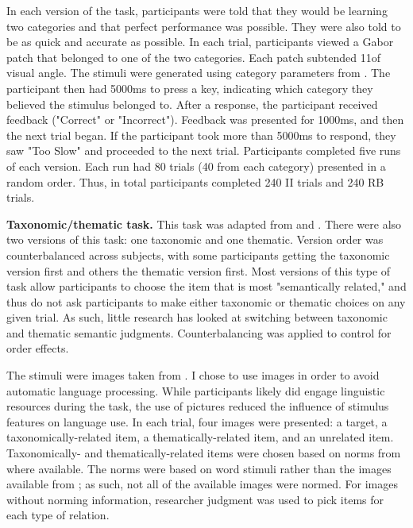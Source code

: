 \documentclass[../dissertation.tex]{subfiles}
\begin{document}
In each version of the task, participants were told that they would be learning two categories and that perfect performance was possible. They were also told to be as quick and accurate as possible. In each trial, participants viewed a Gabor patch that belonged to one of the two categories. Each patch subtended 11\degree  of visual angle. The stimuli were generated using category parameters from \citet{Maddox2003}. The participant then had 5000ms to press a key, indicating which category they believed the stimulus belonged to. After a response, the participant received feedback ("Correct" or "Incorrect"). Feedback was presented for 1000ms, and then the next trial began. If the participant took more than 5000ms to respond, they saw "Too Slow" and proceeded to the next trial. Participants completed five runs of each version. Each run had 80 trials (40 from each category) presented in a random order. Thus, in total participants completed 240 II trials and 240 RB trials. \par
\textbf{Taxonomic/thematic task.} This task was adapted from \citet{Murphy2001} and \citet{Kalenine2009}. There were also two versions of this task: one taxonomic and one thematic. Version order was counterbalanced across subjects, with some participants getting the taxonomic version first and others the thematic version first. Most versions of this type of task allow participants to choose the item that is most "semantically related," and thus do not ask participants to make either taxonomic or thematic choices on any given trial. As such, little research has looked at switching between taxonomic and thematic semantic judgments. Counterbalancing was applied to control for order effects. \par
The stimuli were images taken from \citet{Konkle2010}. I chose to use images in order to avoid automatic language processing. While participants likely did engage linguistic resources during the task, the use of pictures reduced the influence of stimulus features on language use. In each trial, four images were presented: a target, a taxonomically-related item, a thematically-related item, and an unrelated item. Taxonomically- and thematically-related items were chosen based on norms from \citet{Landrigan2016} where available. The \citet{Landrigan2016} norms were based on word stimuli rather than the images available from \citet{Konkle2010}; as such, not all of the available images were normed. For images without norming information, researcher judgment was used to pick items for each type of relation. \par
\end{document}
